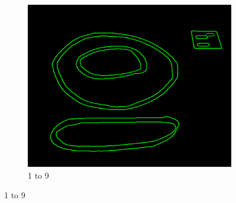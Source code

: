 \documentclass[11pt]{article}
\begin{document}
\begin{figure}[H]
\begin{subfigure}[t]{0.32\textwidth}
		\includegraphics[scale=0.28]{pics/elimination/joinedAfterRemoval9.png}
		\caption{1 to 9}
		\label{construction9}
	\end{subfigure}


\end{figure}
\end{document}
